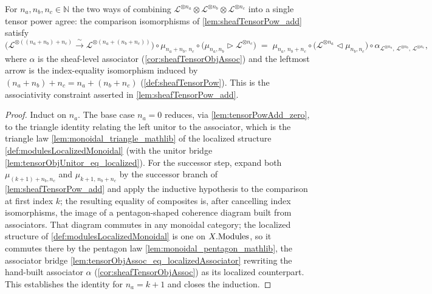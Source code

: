 \begin{lemma}
  \label{lem:tensorPowAdd_assoc}
  For \(n_a, n_b, n_c \in \mathbb{N}\) the two ways of combining
  \(\mathcal{L}^{\otimes n_a} \otimes \mathcal{L}^{\otimes n_b} \otimes
  \mathcal{L}^{\otimes n_c}\) into a single tensor power agree: the comparison
  isomorphisms of \cref{lem:sheafTensorPow_add} satisfy
  \[
    \bigl(\mathcal{L}^{\otimes ((n_a+n_b)+n_c)}
      \xrightarrow{\ \sim\ } \mathcal{L}^{\otimes (n_a+(n_b+n_c))}\bigr)
      \circ \mu_{n_a+n_b,\,n_c}
      \circ \bigl(\mu_{n_a,n_b} \rhd \mathcal{L}^{\otimes n_c}\bigr)
    \;=\;
    \mu_{n_a,\,n_b+n_c}
      \circ \bigl(\mathcal{L}^{\otimes n_a} \lhd \mu_{n_b,n_c}\bigr)
      \circ \alpha_{\mathcal{L}^{\otimes n_a},\,\mathcal{L}^{\otimes n_b},\,
        \mathcal{L}^{\otimes n_c}},
  \]
  where \(\alpha\) is the sheaf-level associator (\cref{cor:sheafTensorObjAssoc})
  and the leftmost arrow is the index-equality isomorphism induced by
  \((n_a+n_b)+n_c = n_a+(n_b+n_c)\) (\cref{def:sheafTensorPow}). This is the
  associativity constraint asserted in \cref{lem:sheafTensorPow_add}.
\end{lemma}

\begin{proof}
  Induct on \(n_a\). The base case \(n_a = 0\) reduces, via
  \cref{lem:tensorPowAdd_zero}, to the triangle identity relating the left unitor
  to the associator, which is the triangle law
  \cref{lem:monoidal_triangle_mathlib} of the localized structure
  \cref{def:modulesLocalizedMonoidal} (with the unitor bridge
  \cref{lem:tensorObjUnitor_eq_localized}). For the successor step, expand both
  \(\mu_{(k+1)+n_b,n_c}\) and \(\mu_{k+1,\,n_b+n_c}\) by the successor branch of
  \cref{lem:sheafTensorPow_add} and apply the inductive hypothesis to the
  comparison at first index \(k\); the resulting equality of composites is, after
  cancelling index isomorphisms, the image of a pentagon-shaped coherence diagram
  built from associators. That diagram commutes in any monoidal category; the
  localized structure of \cref{def:modulesLocalizedMonoidal} is one on
  \(X.\mathrm{Modules}\), so it commutes there by the pentagon law
  \cref{lem:monoidal_pentagon_mathlib}, the associator bridge
  \cref{lem:tensorObjAssoc_eq_localizedAssociator} rewriting the hand-built
  associator \(\alpha\) (\cref{cor:sheafTensorObjAssoc}) as its localized
  counterpart. This establishes the identity for \(n_a = k+1\) and closes the
  induction.
\end{proof}

